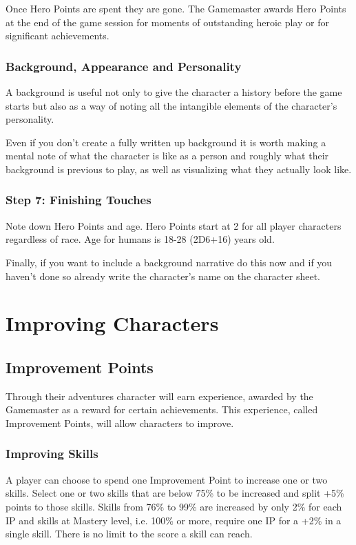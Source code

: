 Once Hero Points are spent they are gone. The Gamemaster awards Hero Points at the end of the game session for moments of outstanding heroic play or for significant achievements.

\subsubsection{Background, Appearance and Personality}
A background is useful not only to give the character a history before the game starts but also as a way of noting all the intangible elements of the character’s personality. 

Even if you don’t create a fully written up background it is worth making a mental note of what the character is like as a person and roughly what their background is previous to play, as well as visualizing what they actually look like. 

\subsubsection{Step 7: Finishing Touches}
Note down Hero Points and age. Hero Points start at 2 for all player characters regardless of race. Age for humans is 18-28 (2D6+16) years old.

Finally, if you want to include a background narrative do this now and if you haven’t done so already write the character’s name on the character sheet.


\section{Improving Characters}

\subsection{Improvement Points}
\label{ssec:improvement-points}
Through their adventures character will earn experience, awarded by the Gamemaster as a reward for certain achievements. This experience, called Improvement Points, will allow characters to improve.

\subsubsection{Improving Skills}
A player can choose to spend one Improvement Point to increase one or two skills.
Select one or two skills that are below 75\% to be increased and split +5\% points to those skills. Skills from 76\% to 99\% are increased by only 2\% for each IP and skills at Mastery level, i.e. 100\% or more, require one IP for a +2\% in a single skill.
There is no limit to the score a skill can reach. 


